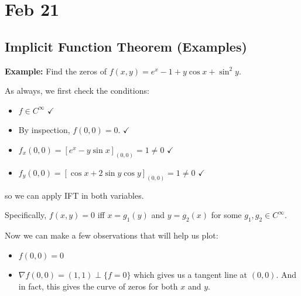 \documentclass[12pt]{report}
\newcommand*{\tbf}[1]{\ifmmode\mathbf{#1}\else\textbf{#1}\fi}
\begin{document}
\section{Feb 21}
\subsection{Implicit Function Theorem (Examples)}

\tbf{Example:} Find the zeros of $f(x, y) = e^x - 1 + y\cos x + \sin^2 y$.

As always, we first check the conditions:
\begin{itemize}
    \item $f \in C^{\infty}$ \quad \textcolor{mygreen}{$\checkmark$}
    \item By inspection, $f(0, 0) = 0$. \quad \textcolor{mygreen}{$\checkmark$}
    \item $f_x(0, 0) = [e^x - y\sin x]_{(0, 0)} = 1 \neq 0$ \quad \textcolor{mygreen}{$\checkmark$}
    \item $f_y(0, 0) = [\cos x + 2\sin y \cos y]_{(0, 0)} = 1 \neq 0$ \quad \textcolor{mygreen}{$\checkmark$}
\end{itemize}

so we can apply IFT in both variables.

Specifically, $f(x, y) = 0$ iff $x = g_1(y)$ and $y = g_2(x)$ for some $g_1, g_2 \in C^{\infty}$.

Now we can make a few observations that will help us plot:
\begin{itemize}
    \item $f(0, 0) = 0$
    \item $\nabla f(0, 0) = (1, 1) \perp \{f = 0\}$ which gives us a tangent line at $(0, 0)$. And in fact, this gives the curve of zeros for both $x$ and $y$.
\end{itemize}

\begin{center}
\end{center}
\end{document}
